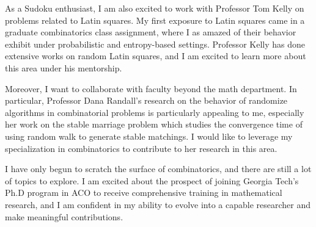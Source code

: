 \documentclass[12pt]{article}
\begin{document}
As a Sudoku enthusiast, I am also excited to work with Professor Tom Kelly on problems related to
Latin squares. My first exposure to Latin squares came in a graduate combinatorics class assignment,
where I as amazed of their behavior exhibit under probabilistic and entropy-based settings.
Professor Kelly has done extensive works on random Latin squares, and I am excited to learn more
about this area under his mentorship.

Moreover, I want to collaborate with faculty beyond the math department. In particular, Professor
Dana Randall's research on the behavior of randomize algorithms in combinatorial problems is
particularly appealing to me, especially her work on the stable marriage problem\cite{inproceedings}
which studies the convergence time of using random walk to generate stable matchings. I would like
to leverage my specialization in combinatorics to contribute to her research in this area.

I have only begun to scratch the surface of combinatorics, and there are still a lot of topics to
explore. I am excited about the prospect of joining Georgia Tech's Ph.D program in ACO to receive
comprehensive training in mathematical research, and I am confident in my ability to evolve into a
capable researcher and make meaningful contributions.  

\newpage




\end{document}
